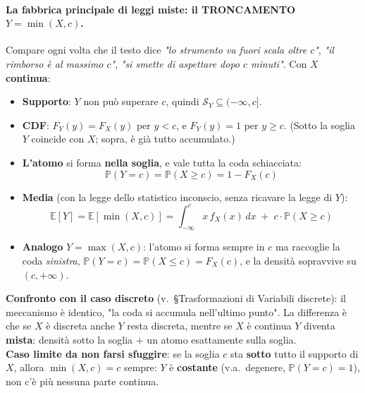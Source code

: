 \documentclass[12pt]{extarticle} %
\begin{document}
\paragraph{La fabbrica principale di leggi miste: il TRONCAMENTO $Y = \min(X, c)$.} Compare ogni volta che il testo dice \emph{"lo strumento va fuori scala oltre $c$"}, \emph{"il rimborso è al massimo $c$"}, \emph{"si smette di aspettare dopo $c$ minuti"}. Con $X$ \textbf{continua}:
\begin{itemize}
    \item \textbf{Supporto}: $Y$ non può superare $c$, quindi $\mathcal{S}_Y \subseteq (-\infty, c]$.
    \item \textbf{CDF}: \; $F_Y(y) = F_X(y)$ per $y < c$, \; e $F_Y(y) = 1$ per $y \ge c$. {\footnotesize (Sotto la soglia $Y$ coincide con $X$; sopra, è già tutto accumulato.)}
    \item \textbf{L'atomo} si forma \textbf{nella soglia}, e vale tutta la coda schiacciata:
    $$ \boxed{\;\mathbb{P}(Y = c) = \mathbb{P}(X \ge c) = 1 - F_X(c)\;} $$
    \item \textbf{Media} (con la legge dello statistico inconscio, senza ricavare la legge di $Y$):
    $$ \mathbb{E}[Y] = \mathbb{E}[\min(X,c)] = \int_{-\infty}^{c} x\, f_X(x)\,dx \;+\; c \cdot \mathbb{P}(X \ge c) $$
    \item \textbf{Analogo} $Y = \max(X, c)$: l'atomo si forma sempre in $c$ ma raccoglie la coda \emph{sinistra}, $\mathbb{P}(Y = c) = \mathbb{P}(X \le c) = F_X(c)$, e la densità sopravvive su $(c, +\infty)$.
\end{itemize}
{\footnotesize \textbf{Confronto con il caso discreto} (v.\ §Trasformazioni di Variabili discrete): il meccanismo è identico, "la coda si accumula nell'ultimo punto". La differenza è che se $X$ è discreta anche $Y$ resta discreta, mentre se $X$ è continua $Y$ diventa \textbf{mista}: densità sotto la soglia $+$ un atomo esattamente sulla soglia. \\
\textbf{Caso limite da non farsi sfuggire}: se la soglia $c$ sta \textbf{sotto} tutto il supporto di $X$, allora $\min(X,c) = c$ sempre: $Y$ è \textbf{costante} (v.a.\ degenere, $\mathbb{P}(Y=c)=1$), non c'è più nessuna parte continua.}
\end{document}
